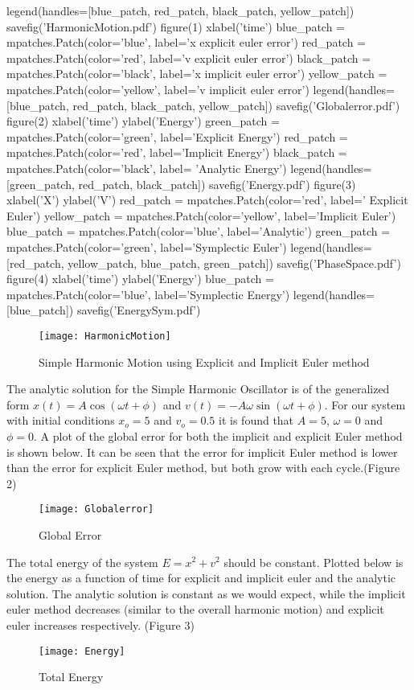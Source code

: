 \documentclass{article}
\begin{document}
\begin{pylabcode}[firstsession]
legend(handles=[blue_patch, red_patch, black_patch, yellow_patch])
savefig('HarmonicMotion.pdf')
figure(1)
xlabel('time')
blue_patch = mpatches.Patch(color='blue', label='x explicit euler error')
red_patch = mpatches.Patch(color='red', label='v explicit euler error')
black_patch = mpatches.Patch(color='black', label='x implicit euler error')
yellow_patch = mpatches.Patch(color='yellow', label='v implicit euler error')
legend(handles=[blue_patch, red_patch, black_patch, yellow_patch])
savefig('Globalerror.pdf')
figure(2)
xlabel('time')
ylabel('Energy')
green_patch = mpatches.Patch(color='green', label='Explicit Energy')
red_patch = mpatches.Patch(color='red', label='Implicit Energy')
black_patch = mpatches.Patch(color='black', label= 'Analytic Energy')
legend(handles= [green_patch, red_patch, black_patch])
savefig('Energy.pdf')
figure(3)
xlabel('X')
ylabel('V')
red_patch = mpatches.Patch(color='red', label=' Explicit Euler')
yellow_patch = mpatches.Patch(color='yellow', label='Implicit Euler')
blue_patch = mpatches.Patch(color='blue', label='Analytic')
green_patch = mpatches.Patch(color='green', label='Symplectic Euler')
legend(handles=[red_patch, yellow_patch, blue_patch, green_patch])
savefig('PhaseSpace.pdf')
figure(4)
xlabel('time')
ylabel('Energy')
blue_patch = mpatches.Patch(color='blue', label='Symplectic Energy')
legend(handles= [blue_patch])
savefig('EnergySym.pdf')

\end{pylabcode}

\begin{figure}[h]
\texttt{[image: HarmonicMotion]}
\caption{Simple Harmonic Motion using Explicit and Implicit Euler method}
\end{figure}

The analytic solution for the Simple Harmonic Oscillator is of the generalized form $ x(t) = A \cos( \omega t + \phi)$ and $ v(t) = -A \omega \sin( \omega t + \phi)$. For our system with initial conditions $x_o = 5$ and $v_o = 0.5$ it is found that  $A=5$, $\omega = 0$ and $ \phi = 0$. A plot of the global error for both the implicit and explicit Euler method is shown below. 
It can be seen that the error for implicit Euler method is lower than the error for explicit Euler method, but both grow with each cycle.(Figure 2)
\begin{figure}[h]
\texttt{[image: Globalerror]}
\caption{Global Error}
\end{figure}
The total energy of the system $E = x^2 + v^2$ should be constant. Plotted below is the energy as a function of time for explicit and implicit euler and the analytic solution. The analytic solution is constant as we would expect, while the implicit euler method decreases (similar to the overall harmonic motion) and explicit euler increases respectively. (Figure 3)
\begin{figure}[h]
\texttt{[image: Energy]}
\caption{Total Energy}
\end{figure}
\end{document}
